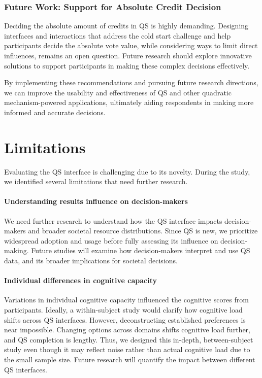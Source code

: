 \subsubsection{Future Work: Support for Absolute Credit Decision}
Deciding the absolute amount of credits in QS is highly demanding. Designing interfaces and interactions that address the cold start challenge and help participants decide the absolute vote value, while considering ways to limit direct influences, remains an open question. Future research should explore innovative solutions to support participants in making these complex decisions effectively.

By implementing these recommendations and pursuing future research directions, we can improve the usability and effectiveness of QS and other quadratic mechanism-powered applications, ultimately aiding respondents in making more informed and accurate decisions.

\section{Limitations}
\label{sec:limitations}
Evaluating the QS interface is challenging due to its novelty. During the study, we identified several limitations that need further research.

\paragraph{Understanding results influence on decision-makers}
We need further research to understand how the QS interface impacts decision-makers and broader societal resource distributions. Since QS is new, we prioritize widespread adoption and usage before fully assessing its influence on decision-making. Future studies will examine how decision-makers interpret and use QS data, and its broader implications for societal decisions.

\paragraph{Individual differences in cognitive capacity}
Variations in individual cognitive capacity influenced the cognitive scores from participants. Ideally, a within-subject study would clarify how cognitive load shifts across QS interfaces. However, deconstructing established preferences is near impossible. Changing options across domains shifts cognitive load further, and QS completion is lengthy. Thus, we designed this in-depth, between-subject study even though it may reflect noise rather than actual cognitive load due to the small sample size. Future research will quantify the impact between different QS interfaces.

